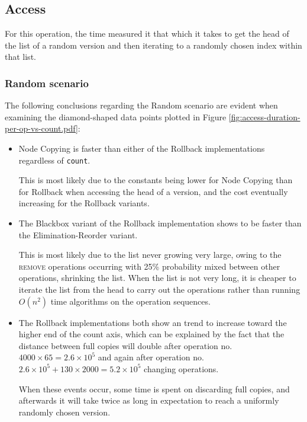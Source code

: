 \subsection{Access}
For this operation, the time measured it that which it takes to get the head of
the list of a random version and then iterating to a randomly chosen index
within that list.

\subsubsection{Random scenario}
The following conclusions regarding the Random scenario are evident when
examining the diamond-shaped data points plotted in Figure
\ref{fig:access-duration-per-op-vs-count.pdf}:

\begin{itemize}

  \item Node Copying is faster than either of the Rollback implementations
  regardless of \texttt{count}.
  
  This is most likely due to the constants being lower for Node Copying than for
  Rollback when accessing the head of a version, and the cost eventually
  increasing for the Rollback variants.
  
  \item The Blackbox variant of the Rollback implementation shows to be faster
  than the Elimination-Reorder variant.
  
  This is most likely due to the list never growing very large, owing to the
  \textsc{remove} operations occurring with 25\% probability mixed between other
  operations, shrinking the list. When the list is not very long, it is cheaper
  to iterate the list from the head to carry out the operations rather than
  running $O(n^2)$ time algorithms on the operation sequences.
  
  \item The Rollback implementations both show an trend to increase toward the
  higher end of the count axis, which can be explained by the fact that the
  distance between full copies will double after operation no.
  $4000\times65 = 2.6\times10^5$ and again after operation no.
  $2.6\times10^5+130\times2000=5.2\times10^5$ changing operations.
  
  When these events occur, some time is spent on discarding full copies, and
  afterwards it will take twice as long in expectation to reach a uniformly
  randomly chosen version.

\end{itemize}

